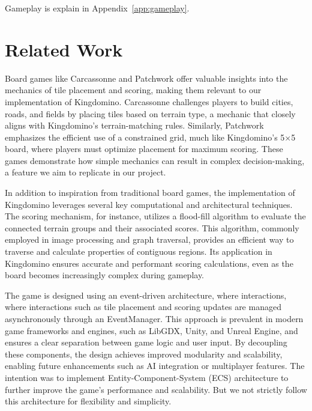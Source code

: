 \documentclass[conference]{IEEEtran}
\begin{document}
Gameplay is explain in Appendix~\ref{app:gameplay}.

\section{Related Work}
\label{sec:related_work}
Board games like Carcassonne\cite{wiki:carcassonne} and
Patchwork\cite{wiki:patchwork} offer valuable insights into the mechanics of
tile placement and scoring, making them relevant to our implementation of
Kingdomino. Carcassonne challenges players to build cities, roads, and fields
by placing tiles based on terrain type, a mechanic that closely aligns with
Kingdomino’s terrain-matching rules. Similarly, Patchwork emphasizes the
efficient use of a constrained grid, much like Kingdomino’s 5×5 board, where
players must optimize placement for maximum scoring. These games demonstrate
how simple mechanics can result in complex decision-making, a feature we aim to
replicate in our project.

In addition to inspiration from traditional board games, the implementation of
Kingdomino leverages several key computational and architectural techniques.
The scoring mechanism, for instance, utilizes a flood-fill
algorithm\cite{wiki:floodfill} to evaluate the connected terrain groups and
their associated scores. This algorithm, commonly employed in image processing
and graph traversal\cite{wiki:graphtraversal}, provides an efficient way to
traverse and calculate properties of contiguous regions. Its application in
Kingdomino ensures accurate and performant scoring calculations, even as the
board becomes increasingly complex during gameplay.

The game is designed using an event-driven architecture\cite{wiki:eventdriven,
    wiki:floodfill}, where interactions, where interactions such as tile placement
and scoring updates are managed asynchronously through an EventManager. This
approach is prevalent in modern game frameworks and engines, such as LibGDX,
Unity, and Unreal Engine, and ensures a clear separation between game logic and
user input. By decoupling these components, the design achieves improved
modularity and scalability, enabling future enhancements such as AI integration
or multiplayer features. The intention was to implement Entity-Component-System
(ECS) architecture\cite{wiki:ecs} to further improve the game's performance and
scalability. But we not strictly follow this architecture for flexibility and
simplicity.
\end{document}
